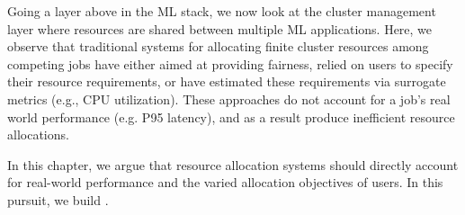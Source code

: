 Going a layer above in the ML stack, we now look at the cluster management layer where resources are shared between multiple ML applications. Here, we observe that 
traditional systems for allocating finite cluster resources among competing jobs
have either aimed at providing fairness,
relied on users to specify their resource requirements,
or have estimated these requirements via surrogate metrics (e.g., CPU utilization).
These approaches do not account for a job's real world performance (e.g. P95 latency), and as a result produce inefficient resource allocations.

In this chapter, 
we argue that resource allocation systems should directly account for real-world
performance and the varied allocation objectives of users.
In this pursuit, we build \cilantro{}. %

